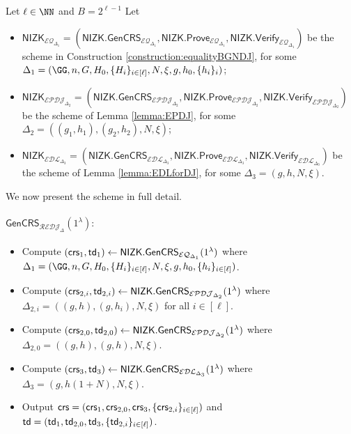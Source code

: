 \begin{construction}
\label{construction:rangeDJ}
Let $\ell\in\NN$ and $B=2^{\ell-1}$
Let
\begin{itemize}
    \item $\mathsf{NIZK}_{\mathcal{EQ}_{\Delta_1}}=(\mathsf{NIZK.GenCRS}_{\mathcal{EQ}_{\Delta_1}},\mathsf{NIZK.Prove}_{\mathcal{EQ}_{\Delta_1}},\mathsf{NIZK.Verify}_{\mathcal{EQ}_{\Delta_1}})$ be the scheme in Construction \ref{construction:equalityBGNDJ}, for some $\Delta_1=(\GG,n,G,H_0,\{H_i\}_{i\in[\ell]},N,\xi,g,h_0,\{h_i\}_i)$;
    
    \item  $\mathsf{NIZK}_{\mathcal{EPDJ}_{\Delta_2}}=(\mathsf{NIZK.GenCRS}_{\mathcal{EPDJ}_{\Delta_2}},\mathsf{NIZK.Prove}_{\mathcal{EPDJ}_{\Delta_2}},\mathsf{NIZK.Verify}_{\mathcal{EPDJ}_{\Delta_2}})$ be the scheme of Lemma \ref{lemma:EPDJ}, for some $\Delta_2=((g_1,h_1),(g_2,h_2),N,\xi)$;
    \item $\mathsf{NIZK}_{\mathcal{EDL}_{\Delta_3}}=(\mathsf{NIZK.GenCRS}_{\mathcal{EDL}_{\Delta_3}},\mathsf{NIZK.Prove}_{\mathcal{EDL}_{\Delta_3}},\mathsf{NIZK.Verify}_{\mathcal{EDL}_{\Delta_3}})$ be the scheme of Lemma \ref{lemma:EDLforDJ}, for some $\Delta_3=(g,h,N,\xi)$. 
\end{itemize}
We now present the scheme in full detail. 
 \paragraph{$\mathsf{GenCRS}_{\mathcal{REDJ}_{\Delta}}(1^\lambda):$}
\begin{itemize}
      \item Compute $(\mathsf{crs}_1,\mathsf{td}_1)\leftarrow\mathsf{NIZK.GenCRS}_{\mathcal{EQ}_{\Delta_1}}(1^\lambda)$ where $\Delta_1=(\GG,n,G,H_0,\{H_i\}_{i\in[\ell]},N,\xi,g,h_0,\{h_i\}_{i\in[\ell]})$.
      \item Compute $(\mathsf{crs}_{2,i},\mathsf{td}_{2,i})\leftarrow\mathsf{NIZK.GenCRS}_{\mathcal{EPDJ}_{\Delta_2}}(1^\lambda)$ where $\Delta_{2,i}=((g,h),(g,h_i),N,\xi)$ for all $i\in [\ell]$.
      \item Compute $(\mathsf{crs}_{2,0},\mathsf{td}_{2,0})\leftarrow\mathsf{NIZK.GenCRS}_{\mathcal{EPDJ}_{\Delta_2}}(1^\lambda)$ where $\Delta_{2,0}=((g,h),(g,h),N,\xi)$.%
     \item Compute $(\mathsf{crs}_3,\mathsf{td}_3)\leftarrow\mathsf{NIZK.GenCRS}_{\mathcal{EDL}_{\Delta_3}}(1^\lambda)$  where $\Delta_3=(g,h(1+N),N,\xi)$.
     \item Output $\mathsf{crs}=(\mathsf{crs}_1,\mathsf{crs}_{2,0},\mathsf{crs}_3,\{\mathsf{crs}_{2,i}\}_{i\in [\ell]})$ and $\mathsf{td}=(\mathsf{td}_1,\mathsf{td}_{2,0},\mathsf{td}_3,\{\mathsf{td}_{2,i}\}_{i\in [\ell]})$.
\end{itemize}


\end{construction}
